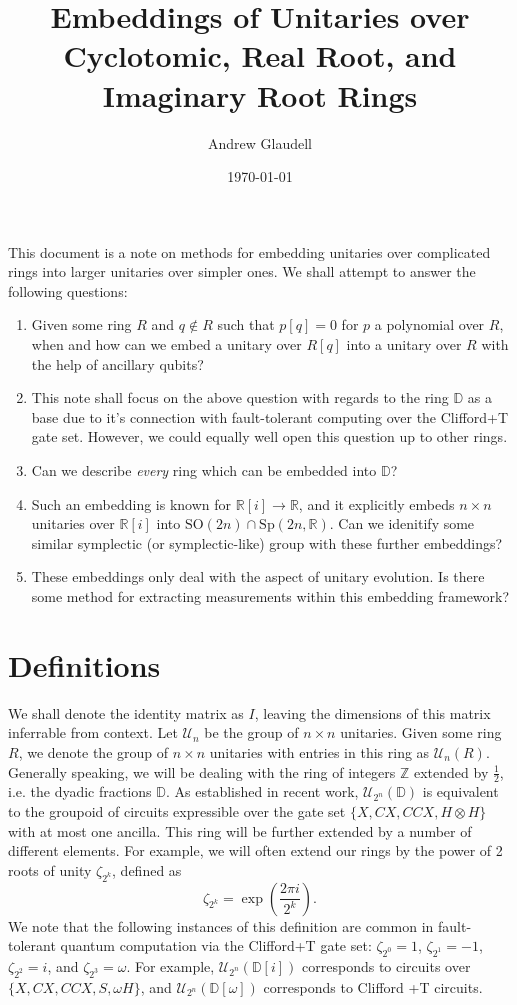 \documentclass{article}
\title{Embeddings of Unitaries over Cyclotomic, Real Root, and Imaginary Root Rings}
\date{\today}
\author{Andrew Glaudell}
\theoremstyle{definition}
\theoremstyle{theorem}
\theoremstyle{remark}
\begin{document}
	\maketitle
	
	This document is a note on methods for embedding unitaries over complicated rings into larger unitaries over simpler ones. We shall attempt to answer the following questions:
	\begin{enumerate}
		\item Given some ring $R$ and $q\not\in R$ such that $p[q]=0$ for $p$ a polynomial over $R$, when and how can we embed a unitary over $R[q]$ into a unitary over $R$ with the help of ancillary qubits?
		\item This note shall focus on the above question with regards to the ring $\mathbb{D}$ as a base due to it's connection with fault-tolerant computing over the Clifford+T gate set. However, we could equally well open this question up to other rings.
		\item Can we describe \emph{every} ring which can be embedded into $\mathbb{D}$?
		\item Such an embedding is known for $\mathbb{R}[i]\rightarrow\mathbb{R}$, and it explicitly embeds $n\times n$ unitaries over $\mathbb{R}[i]$ into $\mbox{SO}(2n)\cap \mbox{Sp}(2n,\mathbb{R})$. Can we idenitify some similar symplectic (or symplectic-like) group with these further embeddings?
		\item These embeddings only deal with the aspect of unitary evolution. Is there some method for extracting measurements within this embedding framework?
	\end{enumerate}
	
	 \section{Definitions}
	 We shall denote the identity matrix as $I$, leaving the dimensions of this matrix inferrable from context. Let $\mathcal{U}_{n}$ be the group of $n\times n$ unitaries. Given some ring $R$, we denote the group of $n\times n$ unitaries with entries in this ring as $\mathcal{U}_{n}(R)$. Generally speaking, we will be dealing with the ring of integers $\mathbb{Z}$ extended by $\frac{1}{2}$, i.e. the dyadic fractions $\mathbb{D}$. As established in recent work, $\mathcal{U}_{2^n}(\mathbb{D})$ is equivalent to the groupoid of circuits expressible over the gate set $\{X,CX,CCX,H\otimes H\}$ with at most one ancilla. This ring will be further extended by a number of different elements. For example, we will often extend our rings by the power of 2 roots of unity $\zeta_{2^k}$, defined as
	 \[
	 	\zeta_{2^k}=\exp\left(\frac{2\pi i}{2^k}\right).
	 \]
	  We note that the following instances of this definition are common in fault-tolerant quantum computation via the Clifford+T gate set: $\zeta_{2^0}=1$, $\zeta_{2^1}=-1$, $\zeta_{2^2}=i$, and $\zeta_{2^3}=\omega$. For example, $\mathcal{U}_{2^n}(\mathbb{D}[i])$ corresponds to circuits over $\{X, CX, CCX, S, \omega H\}$, and $\mathcal{U}_{2^n}(\mathbb{D}[\omega])$ corresponds to Clifford +T circuits.
	  
\end{document}
